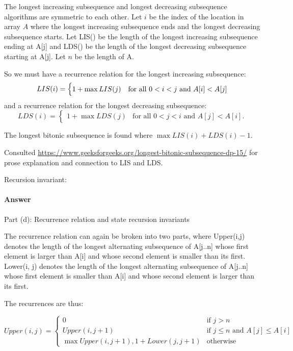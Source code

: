 \documentclass{article}
\begin{document}
The longest increasing subsequence and longest decreasing subsequence algorithms are symmetric to each other. Let $i$ be the index of the location in array $A$ where the longest increasing subsequence ends and the longest decreasing subsequence starts. Let LIS() be the length of the longest increasing subsequence ending at A[j] and LDS() be the length of the longest decreasing subsequence starting at A[j]. Let $n$ be the length of A. 

So we must have a recurrence relation for the longest increasing subsequence: 
\begin{equation}
LIS(i) = 
\begin{cases}
1 + \max{LIS(j)} & \text{for all $ 0 < i < j$ and $A[i] < A[j]$}\\
\end{cases}
\end{equation}
and a recurrence relation for the longest decreasing subsequence:
\begin{equation}
LDS(i) = 
\begin{cases}
1 + \max{LDS(j)} & \text{for all $0 < j < i$ and $A[j] < A[i]$.}
\end{cases}
\end{equation}

The longest bitonic subsequence is found where $\max{LIS(i)+LDS(i)-1}$.

Consulted \url{https://www.geeksforgeeks.org/longest-bitonic-subsequence-dp-15/}  for prose explanation and connection to LIS and LDS. 

Recursion invariant: \todo{}

\paragraph{Answer}{Part (d): Recurrence relation and state recursion invariants}

The recurrence relation can again be broken into two parts, where Upper(i,j) denotes the length of the longest alternating subsequence of A[j..n] whose first element is larger than A[i] and whose second element is smaller than its first. Lower(i, j) denotes the length of the longest alternating subsequence of A[j..n] whose first element is smaller than A[i] and whose second element is larger than its first. 

The recurrences are thus: 

\begin{equation}
Upper(i,j) = 
\begin{cases}
0 & \text{if $j > n$}\\
Upper(i, j+1) & \text{if $j \leq n$ and $A[j] \leq A[i]$}\\
\max{Upper(i, j+1), 1 + Lower(j, j+1)} & \text{otherwise}
\end{cases}
\end{equation}
\end{document}
